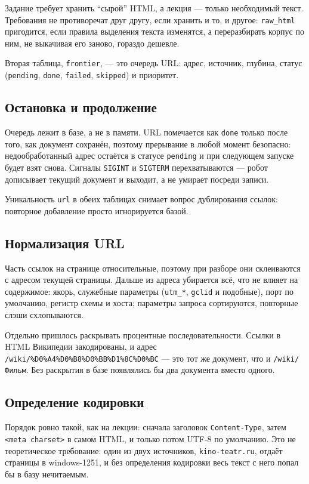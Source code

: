 Задание требует хранить \enquote{сырой} HTML, а лекция --- только необходимый
текст. Требования не противоречат друг другу, если хранить и то, и другое:
\texttt{raw\_html} пригодится, если правила выделения текста изменятся, а
переразбирать корпус по ним, не выкачивая его заново, гораздо дешевле.

Вторая таблица, \texttt{frontier}, --- это очередь URL: адрес, источник, глубина,
статус (\texttt{pending}, \texttt{done}, \texttt{failed}, \texttt{skipped}) и
приоритет.

\subsection*{Остановка и продолжение}

Очередь лежит в базе, а не в памяти. URL помечается как \texttt{done} только
после того, как документ сохранён, поэтому прерывание в любой момент безопасно:
недообработанный адрес остаётся в статусе \texttt{pending} и при следующем
запуске будет взят снова. Сигналы \texttt{SIGINT} и \texttt{SIGTERM}
перехватываются --- робот дописывает текущий документ и выходит, а не умирает
посреди записи.

Уникальность \texttt{url} в обеих таблицах снимает вопрос дублирования ссылок:
повторное добавление просто игнорируется базой.

\subsection*{Нормализация URL}

Часть ссылок на странице относительные, поэтому при разборе они склеиваются с
адресом текущей страницы. Дальше из адреса убирается всё, что не влияет на
содержимое: якорь, служебные параметры (\texttt{utm\_*}, \texttt{gclid} и
подобные), порт по умолчанию, регистр схемы и хоста; параметры запроса
сортируются, повторные слэши схлопываются.

Отдельно пришлось раскрывать процентные последовательности. Ссылки в HTML
Википедии закодированы, и адрес \texttt{/wiki/\%D0\%A4\%D0\%B8\%D0\%BB\%D1\%8C\%D0\%BC}
--- это тот же документ, что и \texttt{/wiki/Фильм}. Без раскрытия в базе
появлялись бы два документа вместо одного.

\subsection*{Определение кодировки}

Порядок ровно такой, как на лекции: сначала заголовок \texttt{Content-Type},
затем \texttt{<meta charset>} в самом HTML, и только потом UTF-8 по умолчанию.
Это не теоретическое требование: один из двух источников,
\texttt{kino-teatr.ru}, отдаёт страницы в windows-1251, и без определения
кодировки весь текст с него попал бы в базу нечитаемым.

